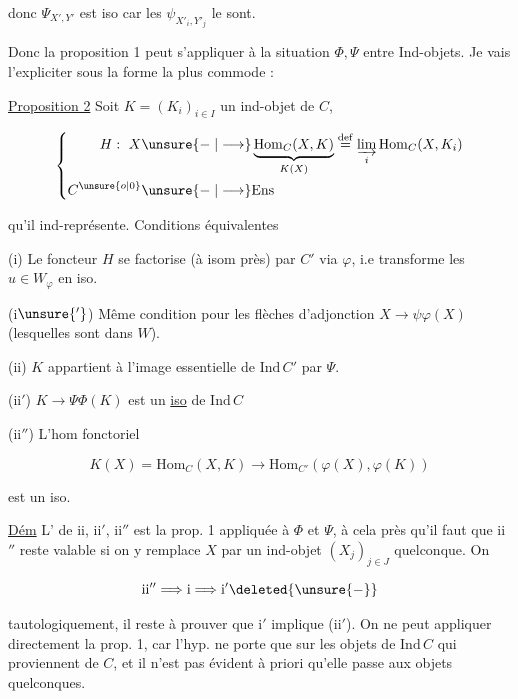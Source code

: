  donc $\Psi_{X',Y'}$ est iso car les $\psi_{X'_i,Y'_j}$ le sont.

Donc la proposition 1 peut s'appliquer à la situation \deleted{$\unsure{\Phi,\Psi}$} $\Phi,\Psi$ entre Ind-objets. Je vais l'expliciter sous la forme la plus commode :

\uline{Proposition 2} Soit $K=(K_i)_{i\in I}$ un ind-objet de $C$,  

\[
 \left\{\begin{aligned}
 H:\ X&\unsure{\relbar|\longrightarrow}\underbrace{\mathrm{Hom}_C(X,K)}_{K(X)}
 \overset{\mathrm{def}}{=}\varinjlim_i\mathrm{Hom}_C(X,K_i)\\
 C^{\unsure{o|0}}&\unsure{\relbar|\longrightarrow}\mathrm{Ens}
 \end{aligned}\right.
\]

qu'il ind-représente. Conditions équivalentes

(i) Le foncteur $H$ se factorise (à isom près) par $C'$ via $\varphi$, i.e transforme les $u\in W_\varphi$ en iso.

(i$\unsure{'}$) Même condition pour les flèches d'adjonction $X\to\psi\varphi(X)$ (lesquelles sont dans $W$).


(ii) $K$ appartient à l'image essentielle de $\mathrm{Ind}\,C'$ par $\Psi$.

(ii$'$) $K\longrightarrow\Psi\Phi(K)$ est un \uline{iso} de $\mathrm{Ind}\,C$

(ii$''$) L'hom fonctoriel

\[
 K(X)=\mathrm{Hom}_C(X,K)\longrightarrow\mathrm{Hom}_{C'}(\varphi(X),\varphi(K))
\]

est un iso.

\uline{Dém} L' de ii, ii$'$, ii$''$ est la prop. 1 appliquée à $\Phi$ et $\Psi$,  à cela près qu'il faut  que ii$''$ reste  valable si on y remplace $X$ par un ind-objet $(X_j)_{j\in J}$ quelconque. On


\[
 \mathrm{ii}''\Longrightarrow\mathrm{i}\Longrightarrow\mathrm{i}'\deleted{\unsure{\relbar}}
\]

tautologiquement, il reste à prouver que i$'$ implique  (ii$'$). On ne peut appliquer directement la prop. 1, car l'hyp.   ne porte que sur les objets de $\mathrm{Ind}\,C$ qui proviennent de $C$, et il n'est pas évident à priori qu'elle passe aux objets quelconques.

